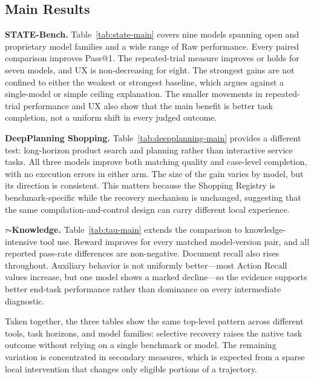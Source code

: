 \subsection*{Main Results}

\textbf{STATE-Bench.} Table~\ref{tab:state-main} covers nine models spanning
open and proprietary model families and a wide range of Raw performance.
Every paired comparison improves Pass@1. The repeated-trial measure improves
or holds for seven models, and UX is non-decreasing for eight. The strongest
gains are not confined to either the weakest or strongest baseline, which
argues against a single-model or simple ceiling explanation. The smaller
movements in repeated-trial performance and UX also show that the main benefit
is better task completion, not a uniform shift in every judged outcome.

\textbf{DeepPlanning Shopping.} Table~\ref{tab:deepplanning-main} provides a
different test: long-horizon product search and planning rather than
interactive service tasks. All three models improve both matching quality and
case-level completion, with no execution errors in either arm. The size of the
gain varies by model, but its direction is consistent. This matters because
the Shopping Registry is benchmark-specific while the recovery mechanism is
unchanged, suggesting that the same compilation-and-control design can carry
different local experience.

\textbf{$\tau$-Knowledge.} Table~\ref{tab:tau-main} extends the comparison to
knowledge-intensive tool use. Reward improves for every matched model-version
pair, and all reported pass-rate differences are non-negative. Document recall
also rises throughout. Auxiliary behavior is not uniformly better---most
Action Recall values increase, but one model shows a marked decline---so the
evidence supports better end-task performance rather than dominance on every
intermediate diagnostic.

Taken together, the three tables show the same top-level pattern across
different tools, task horizons, and model families: selective recovery raises
the native task outcome without relying on a single benchmark or model. The
remaining variation is concentrated in secondary measures, which is expected
from a sparse local intervention that changes only eligible portions of a
trajectory.
